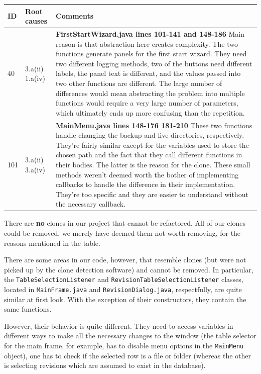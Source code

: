 \documentclass[12pt,a4paper]{article}
\newcommand\tablepar{\vspace{0.25cm}\newline}
\begin{document}
\begin{longtable}{| p{1.5cm} | p{1.25cm} | p{12cm} |}
  \hline
  \textbf{ID} & \textbf{Root causes} & \textbf{Comments} \\ \hline
  40 \newline
  42 & 
  3.a(ii) \newline
  1.a(iv) &
  \textbf{FirstStartWizard.java lines 101-141 and 148-186} \tablepar
  Main reason is that abstraction here creates complexity. The two functions generate panels for the first start wizard. They need two different logging methods, two of the buttons need different labels, the panel text is different, and the values passed into two other functions are different. \tablepar
 The large number of differences would mean abstracting the problem into multiple functions would require a very large number of parameters, which ultimately ends up more confusing than the repetition. \\ \hline
 101 \newline
 102 &
 3.a(ii) \newline
 3.a(iv) &
 \textbf{MainMenu.java lines 148-176 181-210} \tablepar
 These two functions handle changing the backup and live directories, respectively. They're fairly similar except for the variables used to store the chosen path and the fact that they call different functions in their bodies. The latter is the reason for the clone. \tablepar
 These small methods weren't deemed worth the bother of implementing callbacks to handle the difference in their implementation. They're too specific and they are easier to understand without the necessary callback. \\ \hline
\end{longtable}

There are \textbf{no} clones in our project that cannot be refactored. All of our clones could be removed, we merely have deemed them not worth removing, for the reasons mentioned in the table.

There are some areas in our code, however, that resemble clones (but were not picked up by the clone detection software) and cannot be removed. In particular, the \texttt{TableSelecti\-onListener} and \texttt{RevisionTableSelectionListener} classes, located in \texttt{MainFrame.java} and \texttt{RevisionDialog.java}, respectfully, are quite similar at first look. With the exception of their constructors, they contain the same functions.

However, their behavior is quite different. They need to access variables in different ways to make all the necessary changes to the window (the table selector for the main frame, for example, has to disable menu options in the \texttt{MainMenu} object), one has to check if the selected row is a file or folder (whereas the other is selecting revisions which are assumed to exist in the database).
\end{document}
